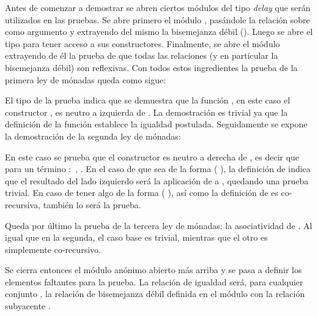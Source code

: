 \begin{AgdaAlign}

Antes de comenzar a demostrar se abren ciertos módulos del tipo \textit{delay} que serán utilizados en las pruebas. Se abre primero el módulo , pasándole la relación \AgdaBound{$\_\sim\_$} sobre  como argumento y extrayendo del mismo la bisemejanza débil (\AgdaFunction{$\_\approx\_$}). Luego se abre el tipo   para tener acceso a sus constructores. Finalmente, se abre el módulo  extrayendo de él la prueba  de que todas las relaciones (y en particular la bisemejanza débil) son reflexivas. Con todos estos ingredientes la prueba de la primera ley de mónadas queda como sigue:


El tipo de la prueba indica que se demuestra que la función , en este caso el constructor , es neutro a izquierda de . La demostración es trivial ya que la definición de la función  establece la igualdad postulada. Seguidamente se expone la demostración de la segunda ley de mónadas:


En este caso se prueba que el constructor  es neutro a derecha de , es decir que para un término  $:$  \AgdaDatatype{$\bot$},    \AgdaFunction{$\approx$} . En el caso de que  sea de la forma ( ), la definición de  indica que el resultado del lado izquierdo será la aplicación de  a , quedando una prueba trivial. En caso de tener algo de la forma ( ), así como la definición de  es co-recursiva, también lo será la prueba. 

Queda por último la prueba de la tercera ley de mónadas: la asociatividad de . Al igual que en la segunda, el caso base es trivial, mientras que el otro es simplemente co-recursivo. 


Se cierra entonces el módulo anónimo abierto más arriba y se pasa a definir los elementos faltantes para la prueba. La relación de igualdad será, para cualquier conjunto , la relación de bisemejanza débil \AgdaFunction{$\_\approx\_$} definida en el módulo  con la relación subyacente \AgdaBound{$\_\sim\_$}.


\end{AgdaAlign}
